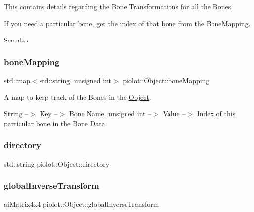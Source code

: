This contains details regarding the Bone Transformations for all the Bones. 

If you need a particular bone, get the index of that bone from the Bone\+Mapping.

\begin{DoxySeeAlso}{See also}

\end{DoxySeeAlso}
\mbox{\label{classpiolot_1_1_object_a7d00c3e5c9727dfd9c9937ba401470d7}} 
\subsubsection{\texorpdfstring{bone\+Mapping}{boneMapping}}
{\footnotesize\ttfamily std\+::map$<$std\+::string, unsigned int$>$ piolot\+::\+Object\+::bone\+Mapping\hspace{0.3cm}{\ttfamily [protected]}}



A map to keep track of the Bones in the \mbox{\hyperlink{classpiolot_1_1_object}{Object}}. 

String --$>$ Key --$>$ Bone Name. unsigned int --$>$ Value --$>$ Index of this particular bone in the Bone Data. \mbox{\label{classpiolot_1_1_object_ab361363059783f44a48c24529aef482e}} 
\subsubsection{\texorpdfstring{directory}{directory}}
{\footnotesize\ttfamily std\+::string piolot\+::\+Object\+::directory\hspace{0.3cm}{\ttfamily [protected]}}

\mbox{\label{classpiolot_1_1_object_a30772cbf9aaab4c5871df82581b8d117}} 
\subsubsection{\texorpdfstring{global\+Inverse\+Transform}{globalInverseTransform}}
{\footnotesize\ttfamily ai\+Matrix4x4 piolot\+::\+Object\+::global\+Inverse\+Transform\hspace{0.3cm}{\ttfamily [protected]}}



